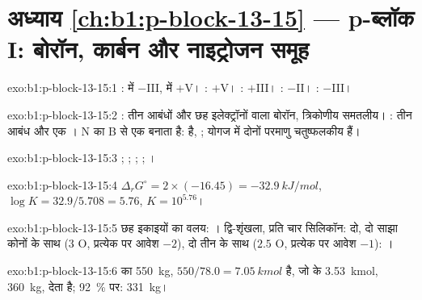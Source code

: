 \section*{अध्याय \ref{ch:b1:p-block-13-15} --- p-ब्लॉक I: बोरॉन, कार्बन और नाइट्रोजन समूह}

\begin{solution}{exo:b1:p-block-13-15:1}
:  में $-$III,  में $+$V। : $+$V।
: $+$III। : $-$II। : $-$III।
\end{solution}

\begin{solution}{exo:b1:p-block-13-15:2}
: तीन आबंधों और छह इलेक्ट्रॉनों वाला बोरॉन, त्रिकोणीय समतलीय।
: तीन आबंध और एक । N का  B से एक  बनाता है:   है,  ;
योगज में दोनों परमाणु चतुष्फलकीय हैं।
\end{solution}

\begin{solution}{exo:b1:p-block-13-15:3}
; ;
; ;
।
\end{solution}

\begin{solution}{exo:b1:p-block-13-15:4}
$\Delta_r G^\circ = 2 \times (-16.45) = \qty{-32.9}{kJ/mol}$, $\log K =
32.9/5.708 = 5.76$, $K = 10^{5.76}$।
\end{solution}

\begin{solution}{exo:b1:p-block-13-15:5}
छह  इकाइयों का वलय: । द्वि-शृंखला, प्रति चार
सिलिकॉन: दो, दो साझा कोनों के साथ (3 O, प्रत्येक पर आवेश $-2$), दो
तीन के साथ ($2.5$ O, प्रत्येक पर आवेश $-1$): ।
\end{solution}

\begin{solution}{exo:b1:p-block-13-15:6}
 का \qty{550}{kg}, $550/78.0 = \qty{7.05}{kmol}$ है, जो
 के \qty{3.53}{kmol}, \qty{360}{kg}, देता है; \qty{92}{\percent} पर:
\qty{331}{kg}।
\end{solution}

